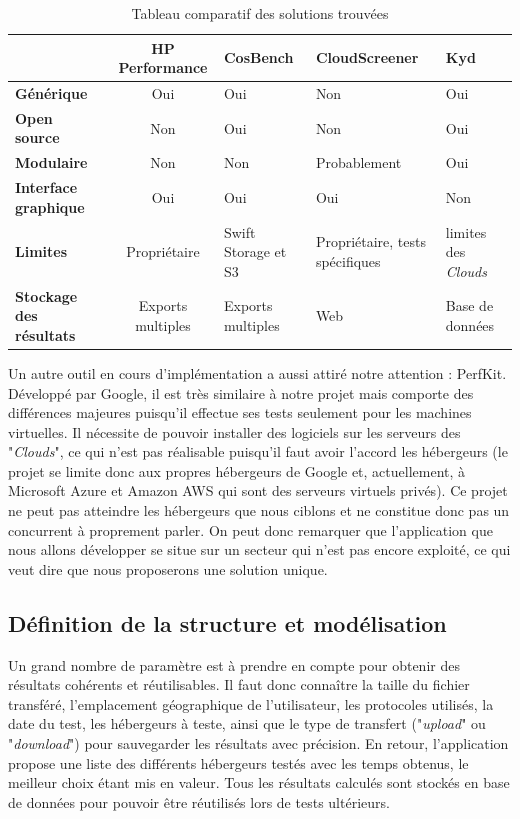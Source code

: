 \documentclass[10pt]{article}
\begin{document}
\begin{table}[h] \caption{Tableau comparatif des solutions trouvées}
\renewcommand{\arraystretch}{1.5} \begin{center}
\begin{tabular}{|p{2cm}|c|p{2cm}|p{3cm}|p{2cm}|} \hline & \bf HP Performance &
\bf CosBench & \bf CloudScreener & \bf Kyd  \\ \hline \bf\centering Générique &
Oui & Oui & Non & Oui \\ \hline \bf\centering Open source & Non & Oui & Non &
Oui \\ \hline \bf\centering Modulaire & Non & Non & Probablement & Oui \\ \hline
\bf\centering Interface graphique & Oui & Oui & Oui & Non \\ \hline
\bf\centering Limites & Propriétaire & Swift Storage et S3 & Propriétaire, tests
spécifiques & limites des \textit{Clouds} \\ \hline \bf\centering Stockage des
résultats & Exports multiples & Exports multiples & Web & Base de données \\
\hline \end{tabular} \end{center} \end{table}

Un autre outil en cours d'implémentation a aussi attiré notre attention :
PerfKit. Développé par Google, il est très similaire à notre projet mais
comporte des différences majeures puisqu'il effectue ses tests seulement pour
les machines virtuelles. Il nécessite de pouvoir installer des logiciels sur les
serveurs des "\textit{Clouds}", ce qui n'est pas réalisable puisqu'il faut avoir
l'accord les hébergeurs (le projet se limite donc aux propres hébergeurs de
Google et, actuellement, à Microsoft Azure et Amazon AWS qui sont des serveurs
virtuels privés). Ce projet ne peut pas atteindre les hébergeurs que nous
ciblons et ne constitue donc pas un concurrent à proprement parler. On peut donc
remarquer que l’application que nous allons développer se situe sur un secteur
qui n’est pas encore exploité, ce qui veut dire que nous proposerons une
solution unique.

\subsection{Définition de la structure et modélisation}

Un grand nombre de paramètre est à prendre en compte pour obtenir des résultats
cohérents et réutilisables. Il faut donc connaître la taille du fichier
transféré, l'emplacement géographique de l'utilisateur, les protocoles utilisés,
la date du test, les hébergeurs à teste, ainsi que le type de transfert
("\textit{upload}" ou "\textit{download}") pour sauvegarder les résultats avec
précision. En retour, l'application propose une liste des différents hébergeurs
testés avec les temps obtenus, le meilleur choix étant mis en valeur. Tous les
résultats calculés sont stockés en base de données pour pouvoir être réutilisés
lors de tests ultérieurs.
\end{document}
